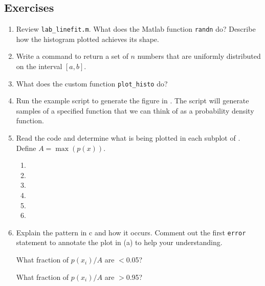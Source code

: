 \documentclass[11pt,titlepage,fleqn]{article}
\begin{document}


\pagebreak
\subsection*{Exercises}

\begin{enumerate}
\item Review \verb+lab_linefit.m+. What does the Matlab function \verb+randn+ do? Describe how the histogram plotted achieves its shape.

\vertgap

\item Write a command to return a set of $n$ numbers that are uniformly distributed on the interval $[a,b]$.

\vertgap

\item What does the custom function \verb+plot_histo+ do?

\vertgap

\item Run the example script to generate the figure in . The script will generate samples of a specified function that we can think of as a probability density function.

\item Read the code and determine what is being plotted in each subplot of . \\
Define $A = \max(p(x))$.
%
\begin{spacing}{2.0}
\begin{enumerate}
\item 
\item 
\item 
\item 
\item 
\item 
\end{enumerate}
\end{spacing}

\item Explain the pattern in c and how it occurs. Comment out the first \verb+error+ statement to annotate the plot in (a) to help your understanding.

What fraction of $p(x_i)/A$ are $<$0.05?

What fraction of $p(x_i)/A$ are $>$0.95?


\end{enumerate}
\end{document}
